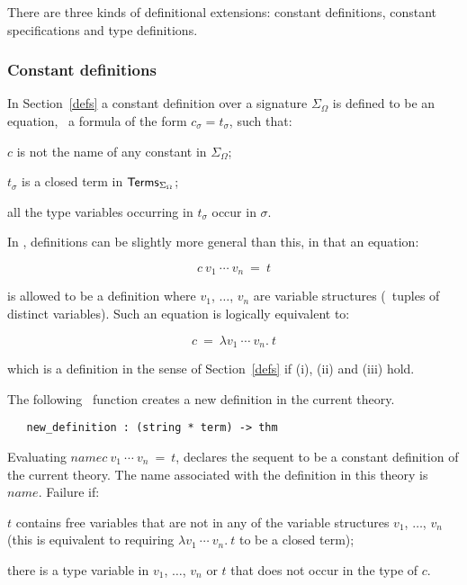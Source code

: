 There are three kinds of definitional extensions:
constant definitions, constant specifications and type definitions.

\subsubsection{Constant definitions}
\label{sec:constant-definitions}

In Section~\ref{defs} a constant definition
%
%
over a signature $\Sigma_{\Omega}$ is defined to be an equation, \ie\
a formula of the form $c_{\sigma}=t_{\sigma}$, such that:
\begin{myenumerate}
\item $c$ is not the name of any constant in $\Sigma_{\Omega}$;
\item $t_{\sigma}$ is a closed term in ${\sf Terms}_{\Sigma_{\Omega}}$;
\item all the type variables occurring in $t_{\sigma}$ occur in $\sigma$.
\end{myenumerate}

In \HOL, definitions can be slightly more general than this, in that
an equation:

\[ c\ v_1\ \cdots\ v_n\ =\ t \]

\noindent is  allowed  to  be a  definition where  $v_1$, $\dots$, $v_n$ are
variable structures (\ie\ tuples of distinct variables).   Such  an equation is
logically equivalent to:

\[ c\ =\ \lambda v_1\ \cdots\ v_n.\  t \]

\noindent which is a definition in the sense of  Section~\ref{defs} if (i),
(ii) and (iii) hold.

The following  \ML\ function  creates a  new definition in
the current theory.

\begin{boxed}
\begin{verbatim}
   new_definition : (string * term) -> thm
\end{verbatim}\end{boxed}


\noindent Evaluating
 $name$$c\ v_1\ \cdots\ v_n\ =\ t$\ml{)},
declares the sequent
 to be a constant definition
of the current theory. The name associated with the definition in
this theory is $name$.
Failure if:
\begin{myenumerate}
\item $t$ contains free variables that are not in any of
the variable structures $v_1$, $\dots$, $v_n$ (this is equivalent
to requiring $\lambda v_1\ \cdots\ v_n.\  t$ to be a closed term);
\item there is a type variable in  $v_1$, $\dots$, $v_n$ or $t$
that does not occur in the type of $c$.
\end{myenumerate}

